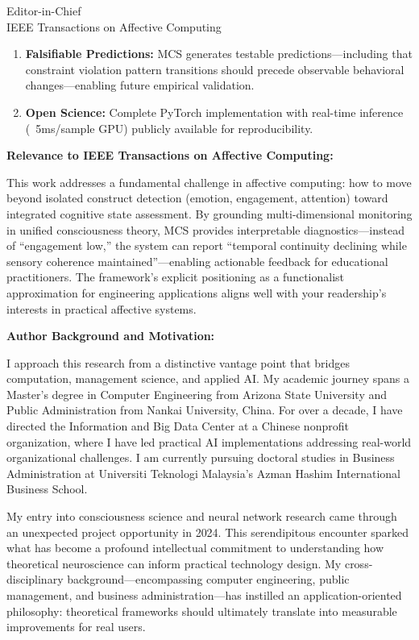 \documentclass[11pt]{letter}
\begin{document}
\begin{letter}{Editor-in-Chief\\IEEE Transactions on Affective Computing}
\begin{enumerate}
    \item \textbf{Falsifiable Predictions:} MCS generates testable predictions---including that constraint violation pattern transitions should precede observable behavioral changes---enabling future empirical validation.
    
    \item \textbf{Open Science:} Complete PyTorch implementation with real-time inference (~5ms/sample GPU) publicly available for reproducibility.
\end{enumerate}

\textbf{Relevance to IEEE Transactions on Affective Computing:}

This work addresses a fundamental challenge in affective computing: how to move beyond isolated construct detection (emotion, engagement, attention) toward integrated cognitive state assessment. By grounding multi-dimensional monitoring in unified consciousness theory, MCS provides interpretable diagnostics---instead of ``engagement low,'' the system can report ``temporal continuity declining while sensory coherence maintained''---enabling actionable feedback for educational practitioners. The framework's explicit positioning as a functionalist approximation for engineering applications aligns well with your readership's interests in practical affective systems.

\textbf{Author Background and Motivation:}

I approach this research from a distinctive vantage point that bridges computation, management science, and applied AI. My academic journey spans a Master's degree in Computer Engineering from Arizona State University and Public Administration from Nankai University, China. For over a decade, I have directed the Information and Big Data Center at a Chinese nonprofit organization, where I have led practical AI implementations addressing real-world organizational challenges. I am currently pursuing doctoral studies in Business Administration at Universiti Teknologi Malaysia's Azman Hashim International Business School.

My entry into consciousness science and neural network research came through an unexpected project opportunity in 2024. This serendipitous encounter sparked what has become a profound intellectual commitment to understanding how theoretical neuroscience can inform practical technology design. My cross-disciplinary background---encompassing computer engineering, public management, and business administration---has instilled an application-oriented philosophy: theoretical frameworks should ultimately translate into measurable improvements for real users.


\end{letter}
\end{document}
